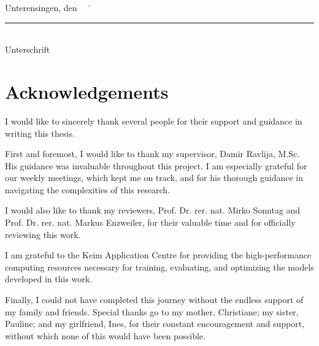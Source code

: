 \begin{tabbing}
          Unterensingen, den \thesisdate ~~	\= \rule{5cm}{0.3mm}\\
                                                                                                    \> Unterschrift
\end{tabbing}

\newpage







\chapter*{Acknowledgements} %

I would like to sincerely thank several people for their support and guidance in writing this thesis.

First and foremost, I would like to thank my supervisor, Damir Ravlija, M.Sc.
His guidance was invaluable throughout this project.
I am especially grateful for our weekly meetings, which kept me on track, and for his thorough guidance in navigating the complexities of this research.

I would also like to thank my reviewers, Prof. Dr. rer. nat. Mirko Sonntag and Prof. Dr. rer. nat. Markus Enzweiler, for their valuable time and for officially reviewing this work.

I am grateful to the Keim Application Centre for providing the high-performance computing resources necessary for training, evaluating, and optimizing the models developed in this work.

Finally, I could not have completed this journey without the endless support of my family and friends.
Special thanks go to my mother, Christiane; my sister, Pauline; and my girlfriend, Ines, for their constant encouragement and support, without which none of this would have been possible.

\newpage
